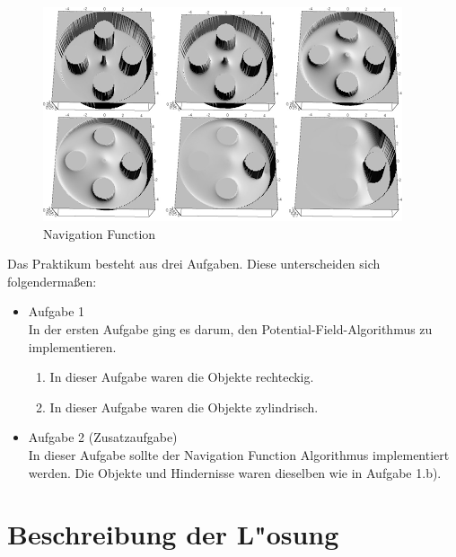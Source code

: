 \documentclass[a4paper]{scrartcl}
\begin{document}
\begin{figure}
\includegraphics[width=\textwidth]{10_navigation_function_illustration.png}
\caption{Navigation Function}
\label{img:Potential2}
\end{figure}
Das Praktikum besteht aus drei Aufgaben. Diese unterscheiden sich folgendermaßen:
\begin{itemize}
\item Aufgabe 1\\ In der ersten Aufgabe ging es darum, den Potential-Field-Algorithmus zu implementieren.
\begin{enumerate}
\item 
In dieser Aufgabe waren die Objekte rechteckig.
\item 
In dieser Aufgabe waren die Objekte zylindrisch.
\end{enumerate}
\item Aufgabe 2 (Zusatzaufgabe)\\
In dieser Aufgabe sollte der Navigation Function Algorithmus implementiert werden. Die Objekte und Hindernisse waren dieselben wie in Aufgabe 1.b).

\end{itemize}



\section*{Beschreibung der L"osung}
\end{document}
